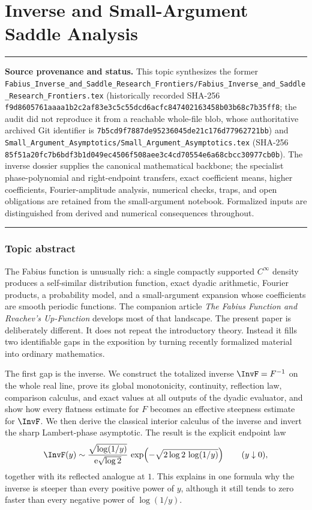 \documentclass[11pt,oneside]{article}
\theoremstyle{definition}
\theoremstyle{remark}
\newcommand{\e}{\mathrm e}
\newenvironment{boxedremark}{%
  \par\smallskip\noindent\begin{center}\begin{minipage}{0.94\textwidth}%
  \color{black}\hrule\vspace{0.6em}\small
}{%
  \vspace{0.6em}\hrule\end{minipage}\end{center}\smallskip
}
\begin{document}
\part{Inverse and Small-Argument Saddle Analysis}
\label{part:inverse}
\begin{boxedremark}
\textbf{Source provenance and status.} This topic synthesizes the former
\nolinkurl{Fabius_Inverse_and_Saddle_Research_Frontiers/Fabius_Inverse_and_Saddle_Research_Frontiers.tex}
(historically recorded SHA-256 \nolinkurl{f9d8605761aaaa1b2c2af83e3c5c55dcd6acfc847402163458b03b68c7b35ff8};
the audit did not reproduce it from a reachable whole-file blob, whose authoritative archived
Git identifier is \nolinkurl{7b5cd9f7887de95236045de21c176d77962721bb})
and \nolinkurl{Small_Argument_Asymptotics/Small_Argument_Asymptotics.tex}
(SHA-256 \nolinkurl{85f51a20fc7b6bdf3b1d049ec4506f508aee3c4cd70554e6a68cbcc30977cb0b}).
The inverse dossier supplies the canonical mathematical backbone; the specialist
phase-polynomial and right-endpoint transfers, exact coefficient means, higher coefficients,
Fourier-amplitude analysis, numerical checks, traps, and open obligations are retained from
the small-argument notebook.  Formalized inputs are distinguished from
derived and numerical consequences throughout.
\end{boxedremark}
\section*{Topic abstract}
The Fabius function is unusually rich: a single compactly supported
$C^\infty$ density produces a self-similar distribution function, exact
dyadic arithmetic, Fourier products, a probability model, and a
small-argument expansion whose coefficients are smooth periodic functions.
The companion article \emph{The Fabius Function and Rvachev's Up-Function}
develops most of that landscape.  The present paper is deliberately
different.  It does not repeat the introductory theory.  Instead it fills
two identifiable gaps in the exposition by turning recently formalized
material into ordinary mathematics.

The first gap is the inverse.  We construct the totalized inverse
$\InvF=F^{-1}$ on the whole real line, prove its global monotonicity,
continuity, reflection law, comparison calculus, and exact values at all
outputs of the dyadic evaluator, and show how every flatness estimate for
$F$ becomes an effective steepness estimate for $\InvF$.  We then derive
the classical interior calculus of the inverse and invert the sharp
Lambert-phase asymptotic.  The result is the explicit endpoint law
\[
 \InvF(y)\sim
 \frac{\sqrt{\log(1/y)}}{\e\sqrt{\log 2}}\,
 \exp\!\left(-\sqrt{2\log 2\,\log(1/y)}\right)
 \qquad (y\downarrow0),
\]
together with its reflected analogue at $1$.  This explains in one formula
why the inverse is steeper than every positive power of $y$, although it
still tends to zero faster than every negative power of $\log(1/y)$.
\end{document}
